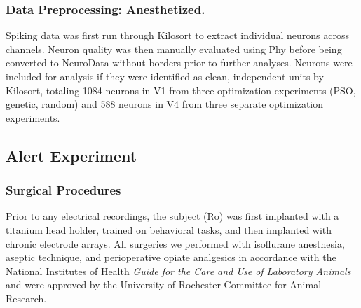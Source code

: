 \subsubsection*{Data Preprocessing: Anesthetized.}
Spiking data was first run through Kilosort \parencite{Steinmetz2021} to extract individual neurons across channels. Neuron quality was then manually evaluated using Phy before being converted to NeuroData without borders prior to further analyses. Neurons were included for analysis if they were identified as clean, independent units by Kilosort, totaling 1084 neurons in V1 from three optimization experiments (PSO, genetic, random) and 588 neurons in V4 from three separate optimization experiments. 


\subsection*{Alert Experiment}

\subsubsection*{Surgical Procedures}
Prior to any electrical recordings, the subject (Ro) was first implanted with a titanium head holder, trained on behavioral tasks, and then implanted with chronic electrode arrays. All surgeries we performed with isoflurane anesthesia, aseptic technique, and perioperative opiate analgesics in accordance with the National Institutes of Health \textit{Guide for the Care and Use of Laboratory Animals} and were approved by the University of Rochester Committee for Animal Research.

